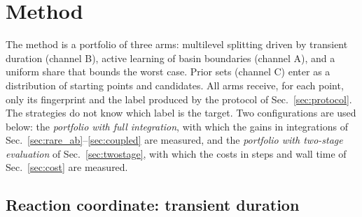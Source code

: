 \section{Method}\label{sec:method}

The method is a portfolio of three arms: multilevel splitting driven by transient duration (channel B), active learning of basin boundaries (channel A), and a uniform share that bounds the worst case. Prior sets (channel C) enter as a distribution of starting points and candidates. All arms receive, for each point, only its fingerprint and the label produced by the protocol of Sec.~\ref{sec:protocol}. The strategies do not know which label is the target. Two configurations are used below: the \emph{portfolio with full integration}, with which the gains in integrations of Sec.~\ref{sec:rare_ab}--\ref{sec:coupled} are measured, and the \emph{portfolio with two-stage evaluation} of Sec.~\ref{sec:twostage}, with which the costs in steps and wall time of Sec.~\ref{sec:cost} are measured.

\subsection{Reaction coordinate: transient duration}\label{sec:xi}

